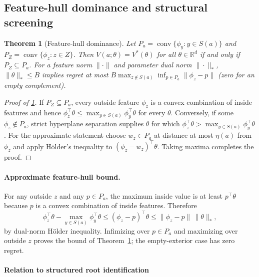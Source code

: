 \documentclass{article}
\theoremstyle{plain}
\newtheorem{theorem}{Theorem}[section]
\theoremstyle{definition}
\DeclareMathOperator{\conv}{conv}
\begin{document}
\subsection{Feature-hull dominance and structural screening}
\label{app:feature-hull}

\begin{theorem}[Feature-hull dominance]\label{thm:t2-hull}
Let $P_a=\conv\{\phi_y:y\in S(a)\}$ and $P_Z=\conv\{\phi_z:z\in Z\}$. Then $V(a;\theta)=V^*(\theta)$ for all $\theta\in\mathbb R^d$ if and only if $P_Z\subseteq P_a$. For a feature norm $\|\cdot\|$ and parameter dual norm $\|\cdot\|_*$, $\|\theta\|_*\le B$ implies regret at most $B\max_{z\notin S(a)}\inf_{p\in P_a}\|\phi_z-p\|$ (zero for an empty complement).
\end{theorem}

\begin{proof}[Proof of \cref{thm:t2-hull}]
If $P_Z\subseteq P_a$, every outside feature $\phi_z$ is a convex
combination of inside features and hence $\phi_z^\top\theta\le
\max_{y\in S(a)}\phi_y^\top\theta$ for every $\theta$. Conversely,
if some $\phi_z\notin P_a$, strict hyperplane separation supplies
$\theta$ for which $\phi_z^\top\theta>\max_{y\in S(a)}\phi_y^\top\theta$.
For the approximate statement choose $w_z\in P_a$ at distance at most
$\eta(a)$ from $\phi_z$ and apply H\"older's inequality to
$(\phi_z-w_z)^\top\theta$. Taking maxima completes the proof.
\end{proof}

\paragraph{Approximate feature-hull bound.}
For any outside $z$ and any $p\in P_a$, the maximum inside value is
at least $p^\top\theta$ because $p$ is a convex combination of inside
features. Therefore
\[
 \phi_z^\top\theta-\max_{y\in S(a)}\phi_y^\top\theta
 \le (\phi_z-p)^\top\theta
 \le\|\phi_z-p\|\,\|\theta\|_*,
\]
by dual-norm H\"older inequality. Infimizing over $p\in P_a$ and
maximizing over outside $z$ proves the bound of
Theorem~\ref{thm:t2-hull}; the empty-exterior case has zero regret.

\paragraph{Relation to structured root identification}
\end{document}
